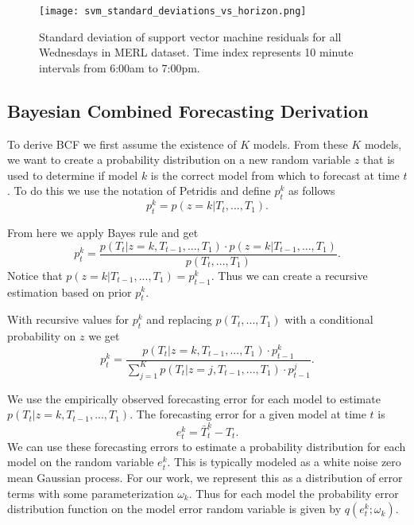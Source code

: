 \begin{figure*}[t]
\centering
\texttt{[image: svm\_standard\_deviations\_vs\_horizon.png]}
\caption{Standard deviation of support vector machine residuals for all Wednesdays in MERL dataset.  Time index represents 10 minute intervals from 6:00am to 7:00pm.}
\label{fig:svmstd}
\end{figure*}

\subsection{Bayesian Combined Forecasting Derivation}
To derive BCF we first assume the existence of $K$ models.  From these $K$ models, we want to create a probability distribution on a new random variable $z$ that is used to determine if model $k$ is the correct model from which to forecast at time $t$.  To do this we use the notation of Petridis \cite{Petridis2001} and define $p_{t}^{k}$ as follows
\begin{equation}
p_{t}^{k} = p(z = k | T_{t}, ..., T_{1}).
\end{equation}

From here we apply Bayes rule and get
\begin{equation}
p_{t}^{k} = \frac{p(T_{t} | z = k, T_{t - 1}, ..., T_{1}) \cdot p(z = k | T_{t - 1}, ..., T_{1})} {p(T_{t}, ..., T_{1})}.
\end{equation}
\noindent
Notice that $p(z = k | T_{t - 1}, ..., T_{1}) = p_{t - 1}^{k}$.  Thus we can create a recursive estimation based on prior $p_{t}^{k}$.

With recursive values for $p_{t}^{k}$ and replacing $p(T_{t}, ..., T_{1})$ with a conditional probability on $z$ we get
\begin{equation}
p_{t}^{k} = \frac{p(T_{t} | z = k, T_{t - 1}, ..., T_{1}) \cdot p_{t - 1}^{k}} {\sum_{j = 1}^{K}p(T_{t} | z = j, T_{t - 1}, ..., T_{1}) \cdot p_{t - 1}^{j}}.
\end{equation}

We use the empirically observed forecasting error for each model to estimate $p(T_{t}|z = k, T_{t - 1}, ..., T_{1})$.  The forecasting error for a given model at time $t$ is 
\begin{equation}
e_{t}^{k} = \bar{T}_{t}^{k} - T_{t}.
\end{equation}
\noindent
We can use these forecasting errors to estimate a probability distribution for each model on the random variable $e_{t}^{k}$.  This is typically modeled as a white noise zero mean Gaussian process.  For our work, we represent this as a distribution of error terms with some parameterization $\omega_{k}$.  Thus for each model the probability error distribution function on the model error random variable is given by $q(e_{t}^{k};\omega_{k})$.


